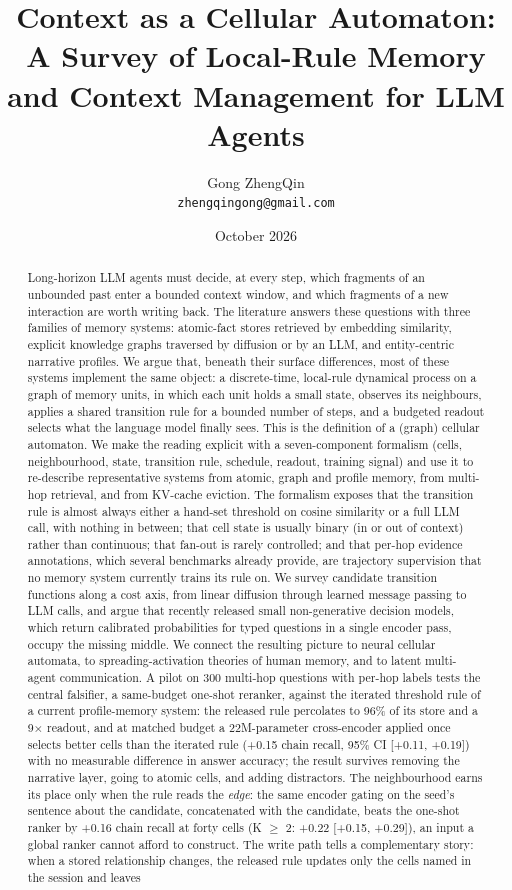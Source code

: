 \documentclass[11pt]{article}
\title{Context as a Cellular Automaton: A Survey of Local-Rule Memory and Context Management for LLM Agents}
\author{Gong ZhengQin\\ \small \texttt{zhengqingong@gmail.com}}
\date{October 2026}
\begin{document}
\maketitle
\begin{abstract}
Long-horizon LLM agents must decide, at every step, which fragments of an unbounded past enter a bounded context window, and which fragments of a new interaction are worth writing back. The literature answers these questions with three families of memory systems: atomic-fact stores retrieved by embedding similarity, explicit knowledge graphs traversed by diffusion or by an LLM, and entity-centric narrative profiles. We argue that, beneath their surface differences, most of these systems implement the same object: a discrete-time, local-rule dynamical process on a graph of memory units, in which each unit holds a small state, observes its neighbours, applies a shared transition rule for a bounded number of steps, and a budgeted readout selects what the language model finally sees. This is the definition of a (graph) cellular automaton. We make the reading explicit with a seven-component formalism (cells, neighbourhood, state, transition rule, schedule, readout, training signal) and use it to re-describe representative systems from atomic, graph and profile memory, from multi-hop retrieval, and from KV-cache eviction. The formalism exposes that the transition rule is almost always either a hand-set threshold on cosine similarity or a full LLM call, with nothing in between; that cell state is usually binary (in or out of context) rather than continuous; that fan-out is rarely controlled; and that per-hop evidence annotations, which several benchmarks already provide, are trajectory supervision that no memory system currently trains its rule on. We survey candidate transition functions along a cost axis, from linear diffusion through learned message passing to LLM calls, and argue that recently released small non-generative decision models, which return calibrated probabilities for typed questions in a single encoder pass, occupy the missing middle. We connect the resulting picture to neural cellular automata, to spreading-activation theories of human memory, and to latent multi-agent communication. A pilot on 300 multi-hop questions with per-hop labels tests the central falsifier, a same-budget one-shot reranker, against the iterated threshold rule of a current profile-memory system: the released rule percolates to 96\% of its store and a 9$\times$ readout, and at matched budget a 22M-parameter cross-encoder applied once selects better cells than the iterated rule (+0.15 chain recall, 95\% CI [+0.11, +0.19]) with no measurable difference in answer accuracy; the result survives removing the narrative layer, going to atomic cells, and adding distractors. The neighbourhood earns its place only when the rule reads the \emph{edge}: the same encoder gating on the seed's sentence about the candidate, concatenated with the candidate, beats the one-shot ranker by +0.16 chain recall at forty cells (K $\geq$ 2: +0.22 [+0.15, +0.29]), an input a global ranker cannot afford to construct. The write path tells a complementary story: when a stored relationship changes, the released rule updates only the cells named in the session and leaves 
\end{abstract}
\end{document}

